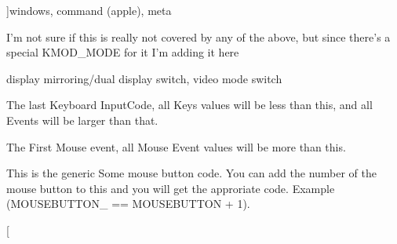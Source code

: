 \begin{Desc}
\begin{description}
{}]windows, command (apple), meta \item[{\em 
\hypertarget{classphys_1_1MetaCode_a3e501cbb5bf0f6f1fdb7211465bda8d8a9e26ea2006e876ccaa80fe4ae441da46}{
KEY\_\-MODE}
\label{da/dc9/classphys_1_1MetaCode_a3e501cbb5bf0f6f1fdb7211465bda8d8a9e26ea2006e876ccaa80fe4ae441da46}
}]I'm not sure if this is really not covered by any of the above, but since there's a special KMOD\_\-MODE for it I'm adding it here \item[{\em 
\hypertarget{classphys_1_1MetaCode_a3e501cbb5bf0f6f1fdb7211465bda8d8aadc4c974c86930fa73a693b7db4f7755}{
KEY\_\-DISPLAYSWITCH}
\label{da/dc9/classphys_1_1MetaCode_a3e501cbb5bf0f6f1fdb7211465bda8d8aadc4c974c86930fa73a693b7db4f7755}
}]display mirroring/dual display switch, video mode switch \item[{\em 
\hypertarget{classphys_1_1MetaCode_a3e501cbb5bf0f6f1fdb7211465bda8d8a1bb7f008c7d430e886141a3b8b697129}{
MOUSE\_\-FIRST}
\label{da/dc9/classphys_1_1MetaCode_a3e501cbb5bf0f6f1fdb7211465bda8d8a1bb7f008c7d430e886141a3b8b697129}
}]The last Keyboard InputCode, all Keys values will be less than this, and all Events will be larger than that. \item[{\em 
\hypertarget{classphys_1_1MetaCode_a3e501cbb5bf0f6f1fdb7211465bda8d8a9cc80a2db206fb540fbb92a8ff64268a}{
MOUSEBUTTON}
\label{da/dc9/classphys_1_1MetaCode_a3e501cbb5bf0f6f1fdb7211465bda8d8a9cc80a2db206fb540fbb92a8ff64268a}
}]The First Mouse event, all Mouse Event values will be more than this. \item[{\em 
\hypertarget{classphys_1_1MetaCode_a3e501cbb5bf0f6f1fdb7211465bda8d8a92ee5571be5e198a62eda83f27b27ab8}{
MOUSEBUTTON\_\-FIRST}
\label{da/dc9/classphys_1_1MetaCode_a3e501cbb5bf0f6f1fdb7211465bda8d8a92ee5571be5e198a62eda83f27b27ab8}
}]This is the generic Some mouse button code. You can add the number of the mouse button to this and you will get the approriate code. Example (MOUSEBUTTON\_ == MOUSEBUTTON + 1). \item[{\em 
}
\end{description}
\end{Desc}
